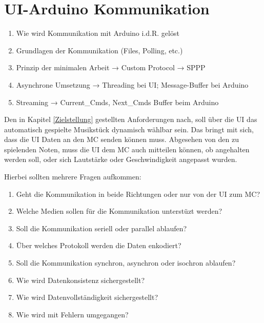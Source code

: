 \section{UI-Arduino Kommunikation} \label{vorgehenSW-SPPP}
\begin{enumerate}
    \item Wie wird Kommunikation mit Arduino i.d.R. gelöst
    \item Grundlagen der Kommunikation (Files, Polling, etc.)
    \item Prinzip der minimalen Arbeit → Custom Protocol → SPPP
    \item Asynchrone Umsetzung → Threading bei UI; Message-Buffer bei Arduino
    \item Streaming → Current\_Cmds, Next\_Cmds Buffer beim Arduino
\end{enumerate}

Den in Kapitel \ref{Zielstellung} gestellten Anforderungen nach, soll über die \ac{UI} das automatisch gespielte Musikstück dynamisch wählbar sein.
Das bringt mit sich, dass die \ac{UI} Daten an den \ac{MC} senden können muss.
Abgesehen von den zu spielenden Noten, muss die \ac{UI} dem \ac{MC} auch mitteilen können, ob angehalten werden soll, oder sich Lautstärke oder Geschwindigkeit angepasst wurden.

Hierbei sollten mehrere Fragen aufkommen:
\begin{enumerate}
    \item Geht die Kommunikation in beide Richtungen oder nur von der \ac{UI} zum \ac{MC}?
    \item Welche Medien sollen für die Kommunikation unterstüzt werden?
    \item Soll die Kommunikation seriell oder parallel ablaufen?
    \item Über welches Protokoll werden die Daten enkodiert?
    \item Soll die Kommunikation synchron, asynchron oder isochron ablaufen?
    \item Wie wird Datenkonsistenz sichergestellt?
    \item Wie wird Datenvollständigkeit sichergestellt?
    \item Wie wird mit Fehlern umgegangen?
\end{enumerate}

